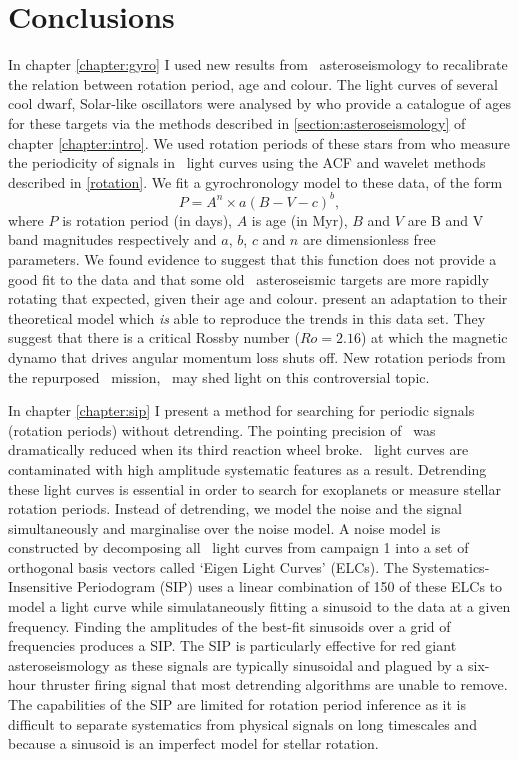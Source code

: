 \chapter{Conclusions}
\label{chapter:conclusions}

In chapter \ref{chapter:gyro} I used new results from \kepler\
asteroseismology to recalibrate the relation between rotation period, age and
colour.
The light curves of several cool dwarf, Solar-like oscillators were analysed
by \citet{Chaplin2014} who provide a catalogue of ages for these targets via
the methods described in \textsection \ref{section:asteroseismology} of
chapter \ref{chapter:intro}.
We used rotation periods of these stars from \citet{Garcia2014} who measure
the periodicity of signals in \kepler\ light curves using the ACF and wavelet
methods described in \textsection \ref{rotation}.
We fit a gyrochronology model to these data, of the form
\begin{equation}
P = A^n \times a(B-V-c)^b,
\end{equation}
\label{eq:Barnes2007_2}
where $P$ is rotation period (in days),
$A$ is age (in Myr), $B$ and $V$ are B and V band magnitudes respectively and
$a$, $b$, $c$ and $n$ are dimensionless free parameters.
We found evidence to suggest that this function does not provide a good fit to
the data and that some old \kepler\ asteroseismic targets are more rapidly
rotating that expected, given their age and colour.
\citet{Vansaders2016} present an adaptation to their theoretical model which
{\it is} able to reproduce the trends in this data set.
They suggest that there is a critical Rossby number ($Ro=2.16$) at which the
magnetic dynamo that drives angular momentum loss shuts off.
New rotation periods from the repurposed \kepler\ mission, \ktwo\ may shed
light on this controversial topic.

In chapter \ref{chapter:sip} I present a method for searching for periodic
signals (\eg rotation periods) without detrending.
The pointing precision of \kepler\ was dramatically reduced when its third
reaction wheel broke.
\ktwo\ light curves are contaminated with high amplitude systematic features
as a result.
Detrending these light curves is essential in order to search for exoplanets
or measure stellar rotation periods.
Instead of detrending, we model the noise and the signal simultaneously and
marginalise over the noise model.
A noise model is constructed by decomposing all \ktwo\ light curves from
campaign 1 into a set of orthogonal basis vectors called `Eigen Light Curves'
(ELCs).
The Systematics-Insensitive Periodogram (SIP) uses a linear combination of
150 of these ELCs to model a light curve while simulataneously fitting a
sinusoid to the data at a given frequency.
Finding the amplitudes of the best-fit sinusoids over a grid of frequencies
produces a SIP.
The SIP is particularly effective for red giant asteroseismology as these
signals are typically sinusoidal and plagued by a six-hour thruster firing
signal that most detrending algorithms are unable to remove.
The capabilities of the SIP are limited for rotation period inference as
it is difficult to separate systematics from physical signals on long
timescales and because a sinusoid is an imperfect model for stellar rotation.

